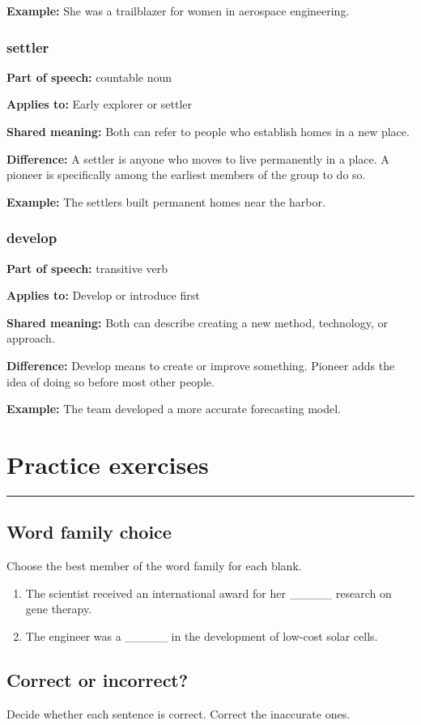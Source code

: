 \documentclass[11pt]{article}
\newcommand{\sectionrule}{\par\vspace{-0.5em}\noindent\textcolor{Accent}{\rule{\linewidth}{0.6pt}}\par}
\begin{document}
\textbf{Example:} She was a trailblazer for women in aerospace engineering.

\subsubsection{settler}
\textbf{Part of speech:} countable noun

\textbf{Applies to:} Early explorer or settler

\textbf{Shared meaning:} Both can refer to people who establish homes in a new place.

\textbf{Difference:} A settler is anyone who moves to live permanently in a place. A pioneer is specifically among the earliest members of the group to do so.

\textbf{Example:} The settlers built permanent homes near the harbor.

\subsubsection{develop}
\textbf{Part of speech:} transitive verb

\textbf{Applies to:} Develop or introduce first

\textbf{Shared meaning:} Both can describe creating a new method, technology, or approach.

\textbf{Difference:} Develop means to create or improve something. Pioneer adds the idea of doing so before most other people.

\textbf{Example:} The team developed a more accurate forecasting model.

\section{Practice exercises}
\sectionrule
\subsection{Word family choice}
Choose the best member of the word family for each blank.

\begin{enumerate}
  \item The scientist received an international award for her \_\_\_\_\_ research on gene therapy.
  \item The engineer was a \_\_\_\_\_ in the development of low-cost solar cells.
\end{enumerate}

\subsection{Correct or incorrect?}
Decide whether each sentence is correct. Correct the inaccurate ones.
\end{document}
